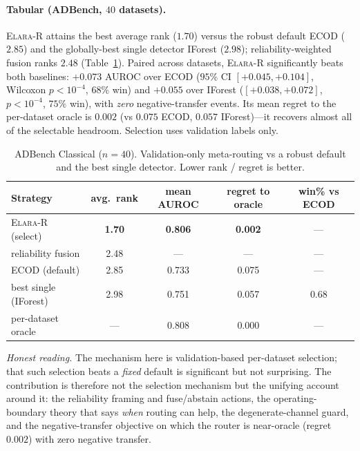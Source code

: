 \documentclass[11pt]{article}
\newcommand{\router}{\textsc{Elara-R}}
\begin{document}
\paragraph{Tabular (ADBench, $40$ datasets).} \router{} attains the best average
rank ($1.70$) versus the robust default ECOD ($2.85$) and the globally-best single
detector IForest ($2.98$); reliability-weighted fusion ranks $2.48$ (Table~\ref{tab:ad}).
Paired across datasets, \router{} significantly beats both baselines: $+0.073$ AUROC
over ECOD ($95\%$ CI $[+0.045,+0.104]$, Wilcoxon $p<10^{-4}$, $68\%$ win) and
$+0.055$ over IForest ($[+0.038,+0.072]$, $p<10^{-4}$, $75\%$ win), with
\emph{zero} negative-transfer events. Its mean regret to the per-dataset oracle is
$0.002$ (vs $0.075$ ECOD, $0.057$ IForest)---it recovers almost all of the
selectable headroom. Selection uses validation labels only.

\begin{table}[t]\centering\small
\caption{ADBench Classical ($n{=}40$). Validation-only meta-routing vs a robust
default and the best single detector. Lower rank / regret is better.}
\label{tab:ad}
\begin{tabular}{lcccc}
\toprule
Strategy & avg.\ rank & mean AUROC & regret to oracle & win\% vs ECOD \\
\midrule
\router{} (select) & \textbf{1.70} & \textbf{0.806} & \textbf{0.002} & --- \\
reliability fusion & 2.48 & --- & --- & --- \\
ECOD (default) & 2.85 & 0.733 & 0.075 & --- \\
best single (IForest) & 2.98 & 0.751 & 0.057 & 0.68 \\
per-dataset oracle & --- & 0.808 & 0.000 & --- \\
\bottomrule
\end{tabular}
\end{table}

\noindent\emph{Honest reading.} The mechanism here is validation-based per-dataset
selection; that such selection beats a \emph{fixed} default is significant but not
surprising. The contribution is therefore not the selection mechanism but the
unifying account around it: the reliability framing and fuse/abstain actions, the
operating-boundary theory that says \emph{when} routing can help, the
degenerate-channel guard, and the negative-transfer objective on which the router
is near-oracle (regret $0.002$) with zero negative transfer.
\end{document}
